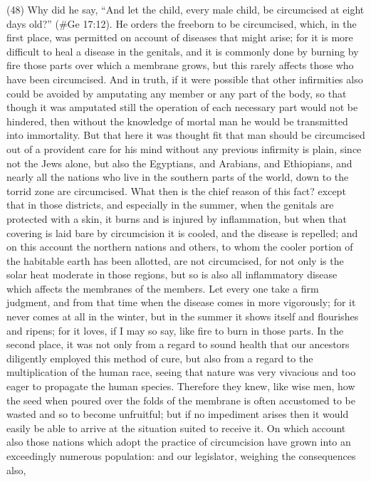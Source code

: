 (48) Why did he say, ``And let the child, every male child, be circumcised at eight days old?''
(\#Ge 17:12). He orders the freeborn to be circumcised, which, in the first place, was permitted
on account of diseases that might arise; for it is more difficult to heal a disease in the genitals, and
it is commonly done by burning by fire those parts over which a membrane grows, but this rarely
affects those who have been circumcised. And in truth, if it were possible that other infirmities also
could be avoided by amputating any member or any part of the body, so that though it was
amputated still the operation of each necessary part would not be hindered, then without the
knowledge of mortal man he would be transmitted into immortality. But that here it was thought fit
that man should be circumcised out of a provident care for his mind without any previous infirmity is
plain, since not the Jews alone, but also the Egyptians, and Arabians, and Ethiopians, and nearly all
the nations who live in the southern parts of the world, down to the torrid zone are circumcised.
What then is the chief reason of this fact? except that in those districts, and especially in the
summer, when the genitals are protected with a skin, it burns and is injured by inflammation, but
when that covering is laid bare by circumcision it is cooled, and the disease is repelled; and on this
account the northern nations and others, to whom the cooler portion of the habitable earth has
been allotted, are not circumcised, for not only is the solar heat moderate in those regions, but so
is also all inflammatory disease which affects the membranes of the members. Let every one take
a firm judgment, and from that time when the disease comes in more vigorously; for it never comes
at all in the winter, but in the summer it shows itself and flourishes and ripens; for it loves, if I may
so say, like fire to burn in those parts. In the second place, it was not only from a regard to sound
health that our ancestors diligently employed this method of cure, but also from a regard to the
multiplication of the human race, seeing that nature was very vivacious and too eager to propagate
the human species. Therefore they knew, like wise men, how the seed when poured over the folds
of the membrane is often accustomed to be wasted and so to become unfruitful; but if no
impediment arises then it would easily be able to arrive at the situation suited to receive it. On
which account also those nations which adopt the practice of circumcision have grown into an
exceedingly numerous population: and our legislator, weighing the consequences also,
